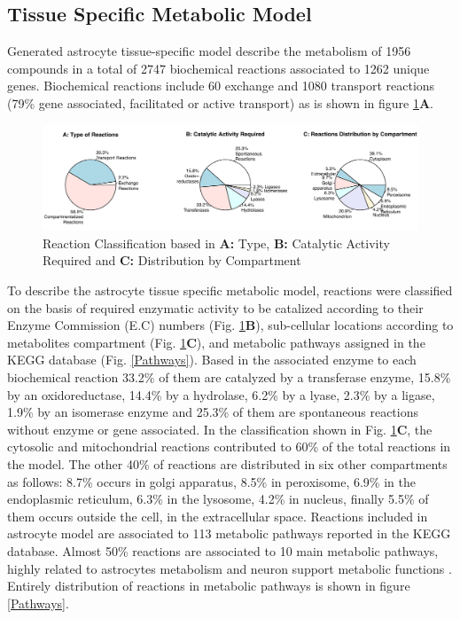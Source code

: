 \subsection*{Tissue Specific Metabolic Model}
Generated astrocyte tissue-specific model describe the metabolism of 1956 compounds in a total of 2747 biochemical reactions associated to 1262 unique genes. Biochemical reactions include 60 exchange and 1080 transport reactions (79\% gene associated, facilitated or active transport) as is shown in figure \ref{Reactions}\textbf{A}.  
\begin{figure}[h]
\begin{center}
\includegraphics[width=\textwidth]{neuroprotective/RXN}
\end{center}
\caption{Reaction Classification based in \textbf{A:} Type, \textbf{B:} Catalytic Activity Required and \textbf{C:} Distribution by Compartment }
\label{Reactions}
\end{figure}

To describe the astrocyte tissue specific metabolic model, reactions were classified on the basis of required enzymatic activity to be catalized according to their Enzyme Commission (E.C) numbers (Fig. \ref{Reactions}\textbf{B}), sub-cellular locations according to metabolites compartment (Fig. \ref{Reactions}\textbf{C}), and metabolic pathways assigned in the KEGG database (Fig. \ref{Pathways}). 
Based in the associated enzyme to each biochemical reaction 33.2\% of them are catalyzed by a transferase enzyme, 15.8\% by an oxidoreductase, 14.4\% by a hydrolase, 6.2\% by a lyase, 2.3\% by a ligase, 1.9\% by an isomerase enzyme and 25.3\% of them are spontaneous reactions without enzyme or gene associated. 
In the classification shown in Fig. \ref{Reactions}\textbf{C}, the cytosolic and mitochondrial reactions contributed to 60\% of the total reactions in the model. The other 40\% of reactions are distributed in six other compartments as follows: 8.7\% occurs in golgi apparatus, 8.5\% in peroxisome, 6.9\% in the endoplasmic reticulum, 6.3\% in the lysosome, 4.2\% in nucleus, finally 5.5\% of them occurs outside the cell, in the extracellular space.
Reactions included in astrocyte model are associated to 113 metabolic pathways reported in the KEGG database. Almost 50\% reactions are associated to 10 main metabolic pathways, highly related to astrocytes metabolism and neuron support metabolic functions \cite{Fitch1997,Ciccarelli2001,Cakir2007,Giaume2010, Sertbas2014, Sa2016}. Entirely distribution of reactions in metabolic pathways is shown in figure \ref{Pathways}. 


